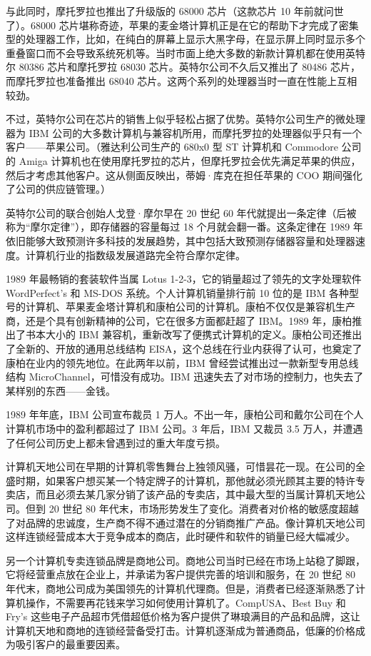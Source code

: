 \documentclass[12pt,UTF8]{ctexbook}
\begin{document}
与此同时，摩托罗拉也推出了升级版的 68000 芯片（这款芯片 10 年前就问世了）。68000 芯片堪称奇迹，苹果的麦金塔计算机正是在它的帮助下才完成了密集型的处理器工作，比如，在纯白的屏幕上显示大黑字母，在显示屏上同时显示多个重叠窗口而不会导致系统死机等。当时市面上绝大多数的新款计算机都在使用英特尔 80386 芯片和摩托罗拉 68030 芯片。英特尔公司不久后又推出了 80486 芯片，而摩托罗拉也准备推出 68040 芯片。这两个系列的处理器当时一直在性能上互相较劲。

不过，英特尔公司在芯片的销售上似乎轻松占据了优势。英特尔公司生产的微处理器为 IBM 公司的大多数计算机与兼容机所用，而摩托罗拉的处理器似乎只有一个客户——苹果公司。（雅达利公司生产的 680x0 型 ST 计算机和 Commodore 公司的 Amiga 计算机也在使用摩托罗拉的芯片，但摩托罗拉会优先满足苹果的供应，然后才考虑其他客户。这从侧面反映出，蒂姆·库克在担任苹果的 COO 期间强化了公司的供应链管理。）

英特尔公司的联合创始人戈登·摩尔早在 20 世纪 60 年代就提出一条定律（后被称为“摩尔定律”），即存储器的容量每过 18 个月就会翻一番。这条定律在 1989 年依旧能够大致预测许多科技的发展趋势，其中包括大致预测存储器容量和处理器速度。计算机行业的指数级发展道路完全符合摩尔定律。

1989 年最畅销的套装软件当属 Lotus 1-2-3，它的销量超过了领先的文字处理软件 WordPerfect's 和 MS-DOS 系统。个人计算机销量排行前 10 位的是 IBM 各种型号的计算机、苹果麦金塔计算机和康柏公司的计算机。康柏不仅仅是兼容机生产商，还是个具有创新精神的公司，它在很多方面都赶超了 IBM。1989 年，康柏推出了书本大小的 IBM 兼容机，重新改写了便携式计算机的定义。康柏公司还推出了全新的、开放的通用总线结构 EISA，这个总线在行业内获得了认可，也奠定了康柏在业内的领先地位。在此两年以前，IBM 曾经尝试推出过一款新型专用总线结构 MicroChannel，可惜没有成功。IBM 迅速失去了对市场的控制力，也失去了某样别的东西——金钱。

1989 年年底，IBM 公司宣布裁员 1 万人。不出一年，康柏公司和戴尔公司在个人计算机市场中的盈利都超过了 IBM 公司。3 年后，IBM 又裁员 3.5 万人，并遭遇了任何公司历史上都未曾遇到过的重大年度亏损。

计算机天地公司在早期的计算机零售舞台上独领风骚，可惜昙花一现。在公司的全盛时期，如果客户想买某一个特定牌子的计算机，那他就必须光顾其主要的特许专卖店，而且必须去某几家分销了该产品的专卖店，其中最大型的当属计算机天地公司。但到 20 世纪 80 年代末，市场形势发生了变化。消费者对价格的敏感度超越了对品牌的忠诚度，生产商不得不通过潜在的分销商推广产品。像计算机天地公司这样连锁经营成本大于竞争成本的商店，此时硬件和软件的销量已经大幅减少。

另一个计算机专卖连锁品牌是商地公司。商地公司当时已经在市场上站稳了脚跟，它将经营重点放在企业上，并承诺为客户提供完善的培训和服务，在 20 世纪 80 年代末，商地公司成为美国领先的计算机代理商。但是，消费者已经逐渐熟悉了计算机操作，不需要再花钱来学习如何使用计算机了。CompUSA、Best Buy 和 Fry's 这些电子产品超市凭借超低价格为客户提供了琳琅满目的产品和品牌，这让计算机天地和商地的连锁经营备受打击。计算机逐渐成为普通商品，低廉的价格成为吸引客户的最重要因素。
\end{document}
